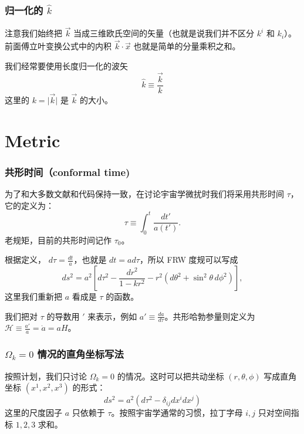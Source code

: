 \documentclass[CJK,13pt]{beamer}
\begin{document}
  \begin{frame}
    \frametitle{归一化的 $\hat{k}$}
    注意我们始终把 $\vec{k}$ 当成三维欧氏空间的矢量（也就是说我们并不区分 $k^i$ 和 $k_i$）。前面傅立叶变换公式中的内积 $\vec{k}\cdot\vec{x}$ 也就是简单的分量乘积之和。

    \skipline
    
    我们经常要使用长度归一化的波矢
    {\blue $$\hat{k}\equiv \frac{\vec{k}}{k}$$}
    这里的 $k = \lvert\vec{k}\rvert$ 是 $\vec{k}$ 的大小。

    \skiplines
    
  \end{frame}

  
  \section{Metric}
  
  \begin{frame}
      \frametitle{共形时间（conformal time) }
        为了和大多数文献和代码保持一致，在讨论宇宙学微扰时我们将采用共形时间 $\tau$，它的定义为：
        $$ \tau \equiv \int_0^t \frac{dt'}{a(t')}.$$
        老规矩，目前的共形时间记作 $\tau_0$。


        \skipline

        根据定义， $d\tau = \frac{dt}{a}$，也就是 $dt = a d\tau$，所以 FRW 度规可以写成
        $$ ds^2 = a^2\left[d\tau^2 - \frac{dr^2}{1-kr^2} - r^2\left(d\theta^2+\sin^2\theta\,d\phi^2\right)\right],$$
        这里我们重新把 $a$ 看成是 $\tau$ 的函数。

        \skipline

        {\blue 我们把对 $\tau$ 的导数用 $'$ 来表示，例如 $a' \equiv \frac{da}{d\tau}$。共形哈勃参量则定义为
        $\mathcal{H} \equiv \frac{a'}{a} = \dot a = aH$。}
  \end{frame}



    \begin{frame}
      \frametitle{$\Omega_k=0$ 情况的直角坐标写法}
      按照计划，我们只讨论 $\Omega_k=0$ 的情况。这时可以把共动坐标 $(r,\theta,\phi)$ 写成直角坐标 $ (x^1, x^2, x^3)$ 的形式：
      $$ ds^2 = a^2\left(d\tau^2-\delta_{ij}dx^i dx^j\right)$$
      这里的尺度因子 $a$ 只依赖于 $\tau$。按照宇宙学通常的习惯，拉丁字母 $i, j$ 只对空间指标 $1,2,3$ 求和。
  \end{frame}
\end{document}
